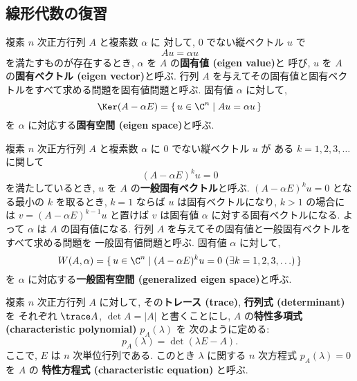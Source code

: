 \documentclass[12pt,twoside]{jarticle}
\begin{document}

\subsection{線形代数の復習}

複素 $n$ 次正方行列 $A$ と複素数 $\alpha$ に
対して, $0$ でない縦ベクトル $u$ で
\begin{equation*}
  A u = \alpha u
\end{equation*}
を満たすものが存在するとき,  $\alpha$ を $A$ の{\bf 固有値 (eigen value)}と
呼び, $u$ を $A$ の{\bf 固有ベクトル (eigen vector)}と呼ぶ.
行列 $A$ を与えてその固有値と固有ベクトルをすべて求める問題を固有値問題と呼ぶ.
固有値 $\alpha$ に対して,
\begin{equation*}
  \Ker(A - \alpha E)
  = \{\, u\in\C^n \mid Au = \alpha u \,\}
\end{equation*}
を $\alpha$ に対応する{\bf 固有空間 (eigen space)}と呼ぶ.

複素 $n$ 次正方行列 $A$ と複素数 $\alpha$ に $0$ でない縦ベクトル $u$ が
ある $k=1,2,3,\ldots$ に関して
\begin{equation*}
  (A - \alpha E)^k u = 0
\end{equation*}
を満たしているとき, $u$ を $A$ の{\bf 一般固有ベクトル}と呼ぶ.
$(A - \alpha E)^k u = 0$ となる最小の $k$ を取るとき,
$k=1$ ならば $u$ は固有ベクトルになり,
$k>1$ の場合には $v = (A - \alpha E)^{k-1}u$ と置けば $v$ は固有値 $\alpha$ 
に対する固有ベクトルになる.  よって $\alpha$ は $A$ の固有値になる. 
行列 $A$ を与えてその固有値と一般固有ベクトルをすべて求める問題を
一般固有値問題と呼ぶ.  固有値 $\alpha$ に対して, 
\begin{equation*}
  W(A,\alpha) 
  = \{\, u\in\C^n \mid (A - \alpha E)^k u = 0 \ (\exists k = 1,2,3,\ldots)\,\}
\end{equation*}
を $\alpha$ に対応する{\bf 一般固有空間 (generalized eigen space)}と呼ぶ.

複素 $n$ 次正方行列 $A$ に対して, 
その{\bf トレース (trace)}, {\bf 行列式 (determinant)} を
それぞれ $\trace A$, $\det A = |A|$ と書くことにし, 
$A$ の{\bf 特性多項式 (characteristic polynomial)} $p_A(\lambda)$ を
次のように定める:
\begin{equation*}
  p_A(\lambda) = \det(\lambda E - A).
\end{equation*}
ここで, $E$ は $n$ 次単位行列である. 
このとき $\lambda$ に関する $n$ 次方程式 $p_A(\lambda)=0$ を $A$ の
{\bf 特性方程式 (characteristic equation)} と呼ぶ. 
\end{document}
